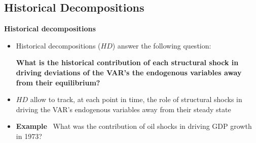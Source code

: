 
\subsection{Historical Decompositions}

\begin{frame}
\vspace{3cm} \color{title}\bigskip

\color{note}
\end{frame}


\begin{frame}
{\textbf{Historical decompositions}}\bigskip \bigskip

\begin{itemize}
\item Historical decompositions ($HD$) answer the following question:\bigskip

\textbf{What is the historical contribution of each structural shock in
driving deviations of the VAR's the endogenous variables away from their
equilibrium?}\bigskip \medskip \pause

\item $HD$ allow to track, at each point in time, the role of structural
shocks in driving the VAR's endogenous variables away from their steady
state\bigskip \medskip

\item \textbf{Example} \ What was the contribution of oil shocks in driving
GDP growth in 1973?
\end{itemize}
\end{frame}


